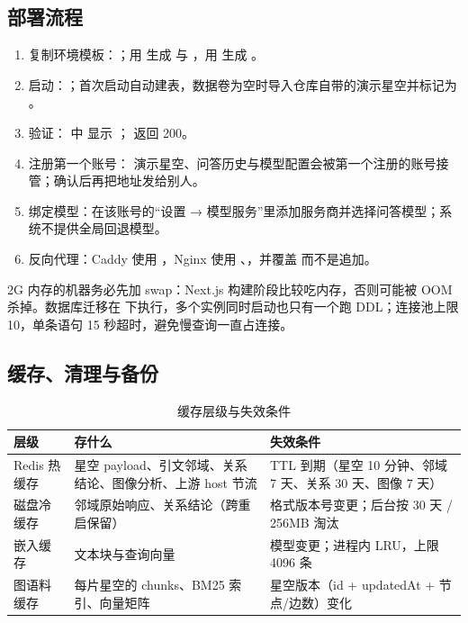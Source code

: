 \subsection{部署流程}

\begin{enumerate}
  \item 复制环境模板：；用  生成  与 ，用  生成 。
  \item 启动：；首次启动自动建表，数据卷为空时导入仓库自带的演示星空并标记为 。
  \item 验证： 中  显示 ； 返回 200。
  \item 注册第一个账号： 演示星空、问答历史与模型配置会被第一个注册的账号接管；确认后再把地址发给别人。
  \item 绑定模型：在该账号的“设置 → 模型服务”里添加服务商并选择问答模型；系统不提供全局回退模型。
  \item 反向代理：Caddy 使用 ，Nginx 使用 、，并覆盖  而不是追加。
\end{enumerate}

2G 内存的机器务必先加 swap：Next.js 构建阶段比较吃内存，否则可能被 OOM 杀掉。数据库迁移在  下执行，多个实例同时启动也只有一个跑 DDL；连接池上限 10，单条语句 15 秒超时，避免慢查询一直占连接。

\subsection{缓存、清理与备份}

\begin{table}[htbp]
  \centering
  \small
  \caption{缓存层级与失效条件}
  \label{tab:cache}
  \begin{tabularx}{\textwidth}{L{2.6cm}L{5.4cm}Y}
    \toprule
\textbf{层级} & \textbf{存什么} & \textbf{失效条件} \\
    \midrule
    Redis 热缓存 & 星空 payload、引文邻域、关系结论、图像分析、上游 host 节流 & TTL 到期（星空 10 分钟、邻域 7 天、关系 30 天、图像 7 天） \\
    磁盘冷缓存 & 邻域原始响应、关系结论（跨重启保留） & 格式版本号变更；后台按 30 天 / 256MB 淘汰 \\
    嵌入缓存 & 文本块与查询向量 & 模型变更；进程内 LRU，上限 4096 条 \\
    图语料缓存 & 每片星空的 chunks、BM25 索引、向量矩阵 & 星空版本（id + updatedAt + 节点/边数）变化 \\
    \bottomrule
  \end{tabularx}
\end{table}

